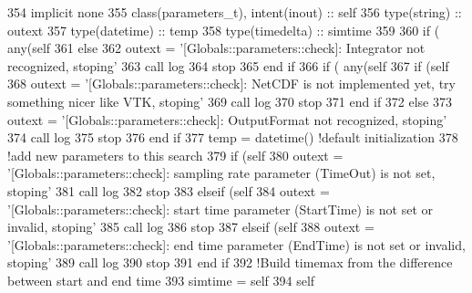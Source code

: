 \begin{DoxyCode}
354     \textcolor{keywordtype}{implicit none}
355     \textcolor{keywordtype}{class}(parameters\_t), \textcolor{keywordtype}{intent(inout)} :: self
356     \textcolor{keywordtype}{type}(string) :: outext
357     \textcolor{keywordtype}{type}(datetime) :: temp
358     \textcolor{keywordtype}{type}(timedelta) :: simtime
359 
360     \textcolor{keywordflow}{if} ( any(self%
361     \textcolor{keywordflow}{else}
362         outext = \textcolor{stringliteral}{'[Globals::parameters::check]: Integrator not recognized, stoping'}
363         \textcolor{keyword}{call }log%
364         stop
365 \textcolor{keywordflow}{    end if}
366     \textcolor{keywordflow}{if} ( any(self%
367         \textcolor{keywordflow}{if} (self%
368             outext = \textcolor{stringliteral}{'[Globals::parameters::check]: NetCDF is not implemented yet, try something nicer like
       VTK, stoping'}
369             \textcolor{keyword}{call }log%
370             stop
371 \textcolor{keywordflow}{        end if}
372     \textcolor{keywordflow}{else}
373         outext = \textcolor{stringliteral}{'[Globals::parameters::check]: OutputFormat not recognized, stoping'}
374         \textcolor{keyword}{call }log%
375         stop
376 \textcolor{keywordflow}{    end if}        
377     temp = datetime() \textcolor{comment}{!default initialization}
378     \textcolor{comment}{!add new parameters to this search}
379     \textcolor{keywordflow}{if} (self%
380         outext = \textcolor{stringliteral}{'[Globals::parameters::check]: sampling rate parameter (TimeOut) is not set, stoping'}
381         \textcolor{keyword}{call }log%
382         stop
383     \textcolor{keywordflow}{elseif} (self%
384         outext = \textcolor{stringliteral}{'[Globals::parameters::check]: start time parameter (StartTime) is not set or invalid,
       stoping'}
385         \textcolor{keyword}{call }log%
386         stop
387     \textcolor{keywordflow}{elseif} (self%
388         outext = \textcolor{stringliteral}{'[Globals::parameters::check]: end time parameter (EndTime) is not set or invalid,
       stoping'}
389         \textcolor{keyword}{call }log%
390         stop
391 \textcolor{keywordflow}{    end if}
392     \textcolor{comment}{!Build timemax from the difference between start and end time}
393     simtime = self%
394     self%
\end{DoxyCode}
\mbox{\label{namespacesimulation__globals__mod_a7caca00d4eeb93c4120f0a8b27dda478}} 
